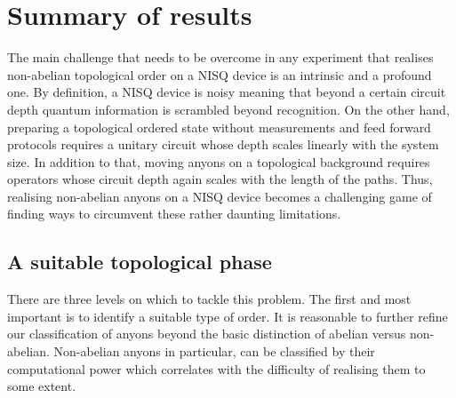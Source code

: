 \documentclass[two column]{article}
\begin{document}
\section{Summary of results}\label{sec:summary_intro}
The main challenge that needs to be overcome in any experiment that realises non-abelian topological order on a NISQ device is an intrinsic and a profound one. By definition, a NISQ device is noisy meaning that beyond a certain circuit depth quantum information is scrambled beyond recognition. On the other hand, preparing a topological ordered state without measurements and feed forward protocols requires a unitary circuit whose depth scales linearly with the system size. In addition to that, moving anyons on a topological background requires operators whose circuit depth again scales with the length of the paths. Thus, realising non-abelian anyons on a NISQ device becomes a challenging game of finding ways to circumvent these rather daunting limitations. 

\subsection{A suitable topological phase}

There are three levels on which to tackle this problem. The first and most important is to identify a suitable type of order. It is reasonable to further refine our classification of anyons beyond the basic distinction of abelian versus non-abelian. Non-abelian anyons in particular, can be classified by their computational power which correlates with the difficulty of realising them to some extent. 
\end{document}
